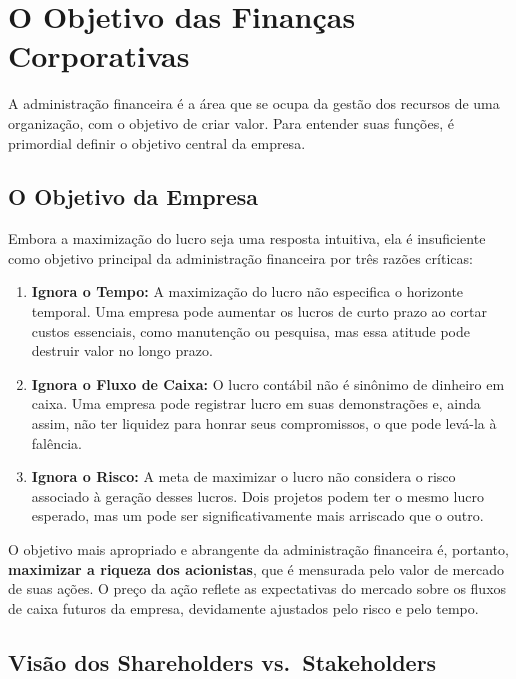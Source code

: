 \documentclass[
  a4paper,
]{book}
\providecommand{\tightlist}{%
  \setlength{\itemsep}{0pt}\setlength{\parskip}{0pt}}\usepackage{longtable,booktabs,array}
\begin{document}
\section{O Objetivo das Finanças
Corporativas}\label{o-objetivo-das-finanuxe7as-corporativas}

A administração financeira é a área que se ocupa da gestão dos recursos
de uma organização, com o objetivo de criar valor. Para entender suas
funções, é primordial definir o objetivo central da empresa.

\subsection{O Objetivo da Empresa}\label{o-objetivo-da-empresa}

Embora a maximização do lucro seja uma resposta intuitiva, ela é
insuficiente como objetivo principal da administração financeira por
três razões críticas:

\begin{enumerate}
\def\labelenumi{\arabic{enumi}.}
\tightlist
\item
  \textbf{Ignora o Tempo:} A maximização do lucro não especifica o
  horizonte temporal. Uma empresa pode aumentar os lucros de curto prazo
  ao cortar custos essenciais, como manutenção ou pesquisa, mas essa
  atitude pode destruir valor no longo prazo.
\item
  \textbf{Ignora o Fluxo de Caixa:} O lucro contábil não é sinônimo de
  dinheiro em caixa. Uma empresa pode registrar lucro em suas
  demonstrações e, ainda assim, não ter liquidez para honrar seus
  compromissos, o que pode levá-la à falência.
\item
  \textbf{Ignora o Risco:} A meta de maximizar o lucro não considera o
  risco associado à geração desses lucros. Dois projetos podem ter o
  mesmo lucro esperado, mas um pode ser significativamente mais
  arriscado que o outro.
\end{enumerate}

O objetivo mais apropriado e abrangente da administração financeira é,
portanto, \textbf{maximizar a riqueza dos acionistas}, que é mensurada
pelo valor de mercado de suas ações. O preço da ação reflete as
expectativas do mercado sobre os fluxos de caixa futuros da empresa,
devidamente ajustados pelo risco e pelo tempo.

\subsection{Visão dos Shareholders
vs.~Stakeholders}\label{visuxe3o-dos-shareholders-vs.-stakeholders}
\end{document}
